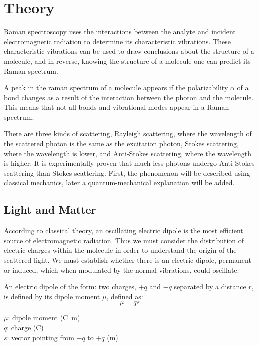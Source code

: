 \section{Theory}

Raman spectroscopy uses the interactions between the analyte and incident electromagnetic radiation to determine its characteristic vibrations. These characteristic vibrations can be used to draw conclusions about the structure of a molecule, and in reverse, knowing the structure of a molecule one can predict its Raman spectrum. 
\bigskip

A peak in the raman spectrum of a molecule appears if the polarizability \( \alpha \) of a bond changes as a result of the interaction between the photon and the molecule. This means that not all bonds and vibrational modes appear in a Raman spectrum. 

\bigskip

There are three kinds of scattering, Rayleigh scattering, where the wavelength of the scattered photon is the same as the excitation photon, Stokes scattering, where the wavelength is lower, and Anti-Stokes scattering, where the wavelength is higher. It is experimentally proven that much less photons undergo Anti-Stokes scattering than Stokes scattering.
First, the phenomenon will be described using classical mechanics, later a quantum-mechanical explanation will be added. 


\subsection{Light and Matter}

According to classical theory, an oscillating electric dipole is the most efficient source of electromagnetic radiation. Thus we must consider the distribution of electric charges within the molecule in order to understand the origin of the scattered light. We must establish whether there is an electric dipole, permanent or induced, which when modulated by the normal vibrations, could oscillate.

\bigskip
An electric dipole of the form: two charges, \(+q\) and \(-q\) separated by a distance \(r\), is defined by its dipole moment \(\mu\), defined as:
\begin{equation}
    \mu=qs
\end{equation}

\(\mu\): dipole moment (\unit{\coulomb\meter})\\
\(q\): charge (\unit{\coulomb})\\
\(s\): vector pointing from \(-q\) to \(+q\) (\unit{\meter})

